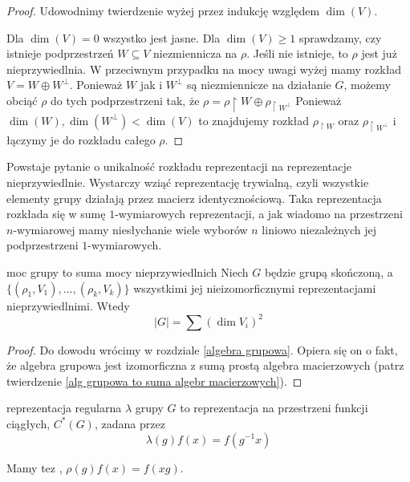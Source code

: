 \begin{proof}
  Udowodnimy twierdzenie wyżej przez indukcję względem $\dim(V)$.

  Dla $\dim(V)=0$ wszystko jest jasne. Dla $\dim(V)\geq 1$ sprawdzamy, czy istnieje podprzestrzeń $W\subseteq V$ niezmiennicza na $\rho$. Jeśli nie istnieje, to $\rho$ jest już nieprzywiedlnia. W przeciwnym przypadku na mocy uwagi wyżej mamy rozkład $V=W\oplus W^\perp$. Ponieważ $W$ jak i $W^\perp$ są niezmiennicze na działanie $G$, możemy obciąć $\rho$ do tych podprzestrzeni tak, że $\rho=\rho\restriction{W}\oplus \rho_{\upharpoonright W^\perp}$
  Ponieważ $\dim(W), \dim(W^\perp)<\dim(V)$ to znajdujemy rozkład $\rho_{\upharpoonright W}$ oraz $\rho_{\upharpoonright W^\perp}$ i łączymy je do rozkładu całego $\rho$.
\end{proof}

Powstaje pytanie o unikalność rozkładu reprezentacji na reprezentacje nieprzywiedlnie. Wystarczy wziąć reprezentację trywialną, czyli wszystkie elementy grupy działają przez macierz identycznościową. Taka reprezentacja rozkłada się w sumę $1$-wymiarowych reprezentacji, a jak wiadomo na przestrzeni $n$-wymiarowej mamy niesłychanie wiele wyborów $n$ liniowo niezależnych jej podprzestrzeni $1$-wymiarowych.

\begin{theorem}{}{moc grupy to suma mocy nieprzywiedlnich}
  Niech $G$ będzie grupą skończoną, a $\{(\rho_1, V_1),...,(\rho_k, V_k)\}$ wszystkimi jej nieizomorficznymi reprezentacjami nieprzywiedlnimi. Wtedy
  $$|G|=\sum (\dim V_i)^2$$
\end{theorem}

\begin{proof}
  Do dowodu wrócimy w rozdziale \ref{algebra grupowa}. Opiera się on o fakt, że algebra grupowa jest izomorficzna z sumą prostą algebra macierzowych (patrz twierdzenie \ref{alg grupowa to suma algebr macierzowych}).
\end{proof}

\begin{definition}{reprezentacja regularna}{}
   $\lambda$ grupy $G$ to reprezentacja na przestrzeni funkcji ciągłych, $C^*(G)$, zadana przez
  $$\lambda(g)f(x)=f(g^{-1}x)$$
\end{definition}

Mamy tez , $\rho(g)f(x)=f(xg)$. 

